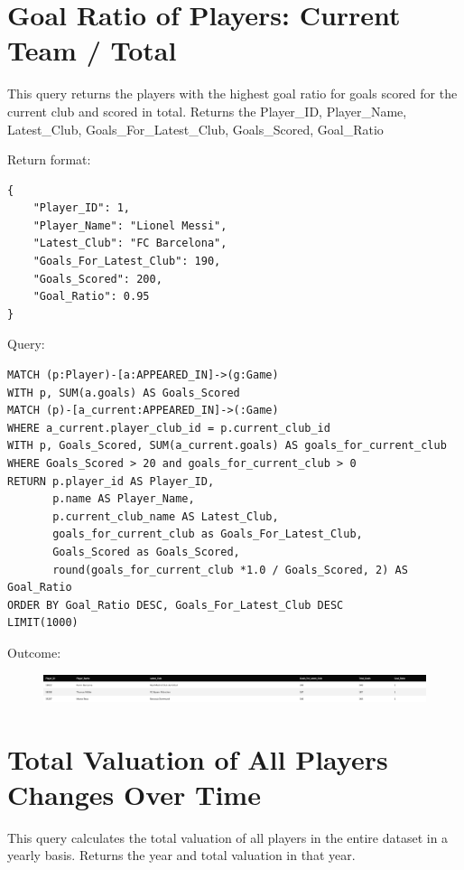 \documentclass{Configuration_Files/PoliMi3i_thesis}
\begin{document}
\section{Goal Ratio of Players: Current Team / Total}
This query returns the players with the highest goal ratio for goals scored for the current club and scored in total.
Returns the Player\_ID, Player\_Name, Latest\_Club, Goals\_For\_Latest\_Club, Goals\_Scored, Goal\_Ratio


Return format:
\begin{lstlisting}[style=json]
{
    "Player_ID": 1,
    "Player_Name": "Lionel Messi",
    "Latest_Club": "FC Barcelona",
    "Goals_For_Latest_Club": 190,
    "Goals_Scored": 200,
    "Goal_Ratio": 0.95
}
\end{lstlisting}


Query:

\begin{lstlisting}[language=Cypher]
MATCH (p:Player)-[a:APPEARED_IN]->(g:Game)
WITH p, SUM(a.goals) AS Goals_Scored
MATCH (p)-[a_current:APPEARED_IN]->(:Game)
WHERE a_current.player_club_id = p.current_club_id
WITH p, Goals_Scored, SUM(a_current.goals) AS goals_for_current_club
WHERE Goals_Scored > 20 and goals_for_current_club > 0
RETURN p.player_id AS Player_ID, 
       p.name AS Player_Name,
       p.current_club_name AS Latest_Club,
       goals_for_current_club as Goals_For_Latest_Club,
       Goals_Scored as Goals_Scored,
       round(goals_for_current_club *1.0 / Goals_Scored, 2) AS Goal_Ratio
ORDER BY Goal_Ratio DESC, Goals_For_Latest_Club DESC
LIMIT(1000)
\end{lstlisting}


Outcome:
\begin{figure}[H]
    \centering
    \includegraphics[width=\linewidth]{Project Template/Images/query_output/q18.png}
\end{figure}






\section{Total Valuation of All Players Changes Over Time}
This query calculates the total valuation of all players in the entire dataset in a yearly basis.
Returns the year and total valuation in that year.
\end{document}
